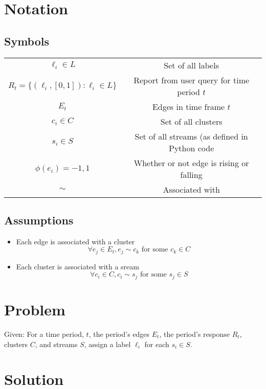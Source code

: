 \documentclass[12pt, letterpaper]{article}
\begin{document}
\section{Notation}
\subsection{Symbols}
\begin{tabular}{c c}
	$\ell_i\in L$	&	Set of all labels\\
	$R_t = \{ (\ell_i, [0,1]) : \ell_i \in L \}$	&	Report from user query for time period $t$\\
	$E_t$	&	Edges in time frame $t$\\
	$c_i\in C$	& 	Set of all clusters\\
	$s_i\in S$	&	Set of all streams (as defined in Python code\\
	$\phi(e_i)=-1,1$&	Whether or not edge is rising or falling\\
	$\sim$	&	Associated with\\
\end{tabular}

\subsection{Assumptions}
\begin{itemize}
	\item Each edge is associated with a cluster
		\[ \forall e_j \in E_t, e_j \sim c_k \text{ for some } c_k \in C \]
	\item Each cluster is associated with a sream
		\[ \forall c_i \in C, c_i \sim s_j \text{ for some } s_j \in S \]
\end{itemize}

\section{Problem}
Given: For a time period, $t$, the period's edges $E_t$, the period's response $R_t$, clusters $C$, and streams $S$, assign a label $\ell_i$ for each $s_i \in S$.

\section{Solution}
\end{document}
